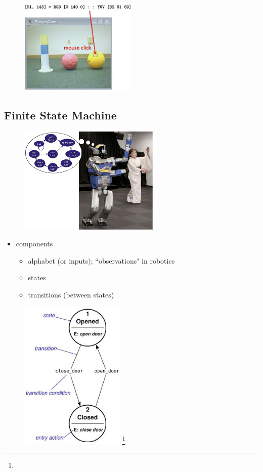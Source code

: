 \begin{figure}[!h]
\centering
\includegraphics[width=0.5\textwidth]{figures/6_color_calibration.jpg}
\end{figure}

\subsection{Finite State Machine}

\begin{figure}[!h]
\centering
\includegraphics[width=0.6\textwidth]{figures/6_fsm_chacha.jpg}
\end{figure}

\begin{itemize}
\item components
\begin{itemize}
\item alphabet (or inputs); ``observations" in robotics
\item states
\item transitions (between states)
\end{itemize}
\end{itemize}

\begin{figure}[!h]
\centering
\includegraphics[width=50mm]{figures/6_general_fsm.jpg}
\footnote{}
\end{figure}

